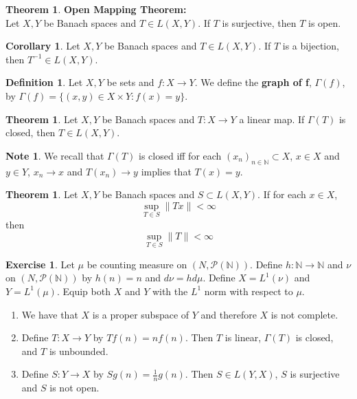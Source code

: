 \documentclass[12pt]{amsart}
\theoremstyle{definition}
\newtheorem{defn}[definition]{Definition}
\newtheorem{note}[definition]{Note}
\newtheorem{thm}[definition]{Theorem}
\newtheorem{cor}[definition]{Corollary}
\newtheorem{ex}[definition]{Exercise}
\newcommand{\Gam}{\Gamma}
\newcommand{\N}{\mathbb{N}}
\newcommand{\MP}{\mathcal{P}}
\newcommand{\tbf}[1]{\textbf{#1}}
\newcommand{\conv}[1]{\xrightarrow{#1}}
\DeclareMathOperator*{\0}{\mbf{0}}
\DeclareMathOperator*{\1}{\mbf{1}}
\newcommand{\lex}[1]{\label{ex:#1}}
\newcommand{\ld}[1]{\label{defn:#1}}
\begin{document}
	\begin{thm} \tbf{Open Mapping Theorem:} \\
		Let $X, Y$ be Banach spaces and $T\in L(X,Y)$. If $T$ is surjective, then $T$ is open.
	\end{thm}
	
	\begin{cor}
		Let $X, Y$ be Banach spaces and $T \in L(X,Y)$. If $T$ is a bijection, then $T^{-1} \in L(X,Y)$.
	\end{cor}
	
	\begin{defn} \ld{}
		Let $X,Y$ be sets and $f:X \rightarrow Y$. We define the \tbf{graph of f}, $\Gam(f)$, by $\Gam(f) = \{(x,y) \in X \times Y: f(x) = y\}$.
	\end{defn}
	
	\begin{thm}
		Let $X, Y$ be Banach spaces and $T:X \rightarrow Y$ a linear map. If $\Gam(T)$ is closed, then $T \in L(X,Y)$.  
	\end{thm}
	
	\begin{note}
		We recall that $\Gam(T)$ is closed iff for each $(x_n)_{n \in \N} \subset X$, $x \in X$ and $y \in Y$, $x_n \conv{} x$ and $T(x_n) \conv{} y$ implies that $T(x) = y$. 
	\end{note}
	
	\begin{thm}
		
		Let $X, Y$ be Banach spaces and $S \subset L(X,Y)$. If for each $x \in X$, $$\sup_{T \in S} \|Tx \|< \infty$$ then $$\sup_{T \in S} \|T \|< \infty$$
	\end{thm}
	
	\begin{ex} \lex{}
		Let $\mu$ be counting measure on $(N, \MP(\N))$. Define $h: \N \rightarrow \N$ and $ \nu$ on $(N, \MP(\N))$ by $h(n) = n$ and $d \nu = h d \mu$. Define $X=L^1(\nu)$ and $Y = L^1(\mu)$. Equip both $X$ and $Y$ with the $L^1$ norm with respect to $\mu$. 
		\begin{enumerate}
			\item We have that $X$ is a proper subspace of $Y$ and therefore $X$ is not complete.
			\item Define $T: X \rightarrow Y$ by $Tf(n) = nf(n)$. Then $T$ is linear, $\Gam(T)$ is closed, and $T$ is unbounded.
			\item Define $S:Y \rightarrow X$ by $Sg(n) = \frac{1}{n}g(n)$. Then $S \in L(Y,X)$, $S$ is surjective and $S$ is not open. 
		\end{enumerate}
	\end{ex}
	
\end{document}
